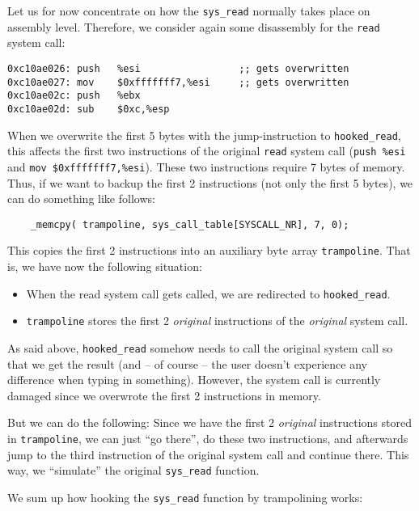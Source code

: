 \documentclass[10pt, letterpaper]{article}
\begin{document}
Let us for now concentrate on how the \texttt{sys\_read} normally takes place on assembly level. Therefore, we consider again some disassembly for the \texttt{read} system call:

\begin{verbatim}
0xc10ae026:	push   %esi                 ;; gets overwritten
0xc10ae027:	mov    $0xfffffff7,%esi     ;; gets overwritten
0xc10ae02c:	push   %ebx
0xc10ae02d:	sub    $0xc,%esp
\end{verbatim}

When we overwrite the first 5 bytes with the jump-instruction to \texttt{hooked\_read}, this affects the first two instructions of the original \texttt{read} system call (\texttt{push \%esi} and \texttt{mov \$0xfffffff7,\%esi}). These two instructions require 7 bytes of memory. Thus, if we want to backup the first 2 instructions (not only the first 5 bytes), we can do something like follows:

\begin{verbatim}
    _memcpy( trampoline, sys_call_table[SYSCALL_NR], 7, 0);
\end{verbatim}

This copies the first 2 instructions into an auxiliary byte array \texttt{trampoline}. That is, we have now the following situation:

\begin{itemize}
\item When the read system call gets called, we are redirected to \texttt{hooked\_read}.
\item \texttt{trampoline} stores the first 2 \emph{original} instructions of the \emph{original} system call.
\end{itemize}

As said above, \texttt{hooked\_read} somehow needs to call the original system call so that we get the result (and -- of course -- the user doesn't experience any difference when typing in something). However, the system call is currently damaged since we overwrote the first 2 instructions in memory.

But we can do the following: Since we have the first 2 \emph{original} instructions stored in \texttt{trampoline}, we can just ``go there'', do these two instructions, and afterwards jump to the third instruction of the original system call and continue there. This way, we ``simulate'' the original \texttt{sys\_read} function.

We sum up how hooking the \texttt{sys\_read} function by trampolining works:
\end{document}
